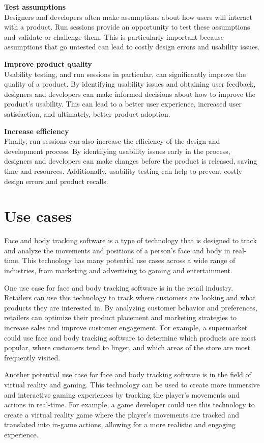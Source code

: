 \textbf{Test assumptions}\\
Designers and developers often make assumptions about how users will interact with a product. Run sessions 
provide an opportunity to test these assumptions and validate or challenge them. This is particularly important 
because assumptions that go untested can lead to costly design errors and usability issues.

\textbf{Improve product quality}\\
Usability testing, and run sessions in particular, can significantly improve the quality of a product. 
By identifying usability issues and obtaining user feedback, designers and developers can make informed 
decisions about how to improve the product's usability. This can lead to a better user experience, 
increased user satisfaction, and ultimately, better product adoption.

\textbf{Increase efficiency}\\
Finally, run sessions can also increase the efficiency of the design and development process. 
By identifying usability issues early in the process, designers and developers can make changes 
before the product is released, saving time and resources. Additionally, usability testing can 
help to prevent costly design errors and product recalls.

\section{Use cases}
Face and body tracking software is a type of technology that is designed to track and analyze the movements and positions 
of a person's face and body in real-time. This technology has many potential use cases across a wide range of industries, 
from marketing and advertising to gaming and entertainment.

One use case for face and body tracking software is in the retail industry. Retailers can use this technology to track 
where customers are looking and what products they are interested in. By analyzing customer behavior and preferences, 
retailers can optimize their product placement and marketing strategies to increase sales and improve customer engagement. 
For example, a supermarket could use face and body tracking software to determine which products are most popular, where 
customers tend to linger, and which areas of the store are most frequently visited.

Another potential use case for face and body tracking software is in the field of virtual reality and gaming. This 
technology can be used to create more immersive and interactive gaming experiences by tracking the player's movements 
and actions in real-time. For example, a game developer could use this technology to create a virtual reality game 
where the player's movements are tracked and translated into in-game actions, allowing for a more realistic and 
engaging experience.

